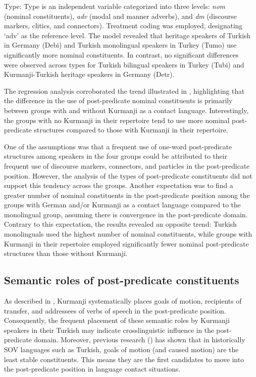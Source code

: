 Type: Type is an independent variable categorized into three levels: \textit{nom} (nominal constituents), \textit{adv} (modal and manner adverbs), and \textit{dm} (discourse markers, clitics, and connectors). Treatment coding was employed, designating ‘adv’ as the reference level. The model revealed that heritage speakers of Turkish in Germany (Debi) and Turkish monolingual speakers in Turkey (Tumo) use significantly more nominal constituents. In contrast, no significant differences were observed across types for Turkish bilingual speakers in Turkey (Tubi) and Kurmanji-Turkish heritage speakers in Germany (Detr).

The regression analysis corroborated the trend illustrated in , highlighting that the difference in the use of post-predicate nominal constituents is primarily between groups with and without Kurmanji as a contact language. Interestingly, the groups with no Kurmanji in their repertoire tend to use more nominal post-predicate structures compared to those with Kurmanji in their repertoire.

One of the assumptions was that a frequent use of one-word post-predicate structures among speakers in the four groups could be attributed to their frequent use of discourse markers, connectors, and particles in the post-predicate position. However, the analysis of the types of post-predicate constituents did not support this tendency across the groups. Another expectation was to find a greater number of nominal constituents in the post-predicate position among the groups with German and/or Kurmanji as a contact language compared to the monolingual group, assuming there is convergence in the post-predicate domain. Contrary to this expectation, the results revealed an opposite trend: Turkish monolinguals used the highest number of nominal constituents, while groups with Kurmanji in their repertoire employed significantly fewer nominal post-predicate structures than those without Kurmanji.

\subsection{Semantic roles of post-predicate constituents}\label{sec:key:5.3.3}
\largerpage

As described in , Kurmanji systematically places goals of motion, recipients of transfer, and addressees of verbs of speech in the post-predicate position. Consequently, the frequent placement of these semantic roles by Kurmanji speakers in their Turkish may indicate crosslinguistic influence in the post-predicate domain. Moreover, previous research (\citealt{Haig2020, Haignforth}) has shown that in historically SOV languages such as Turkish, goals of motion (and caused motion) are the least stable constituents. This means they are the first candidates to move into the post-predicate position in language contact situations.


